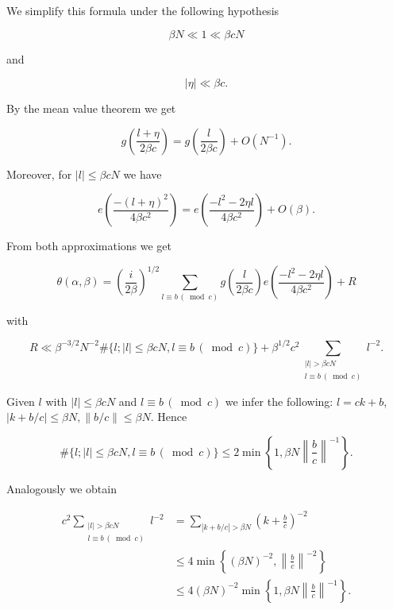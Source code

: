 \documentclass[10pt]{article}
\begin{document}
We simplify this formula under the following hypothesis


\begin{equation*}
\beta N \ll 1 \ll \beta c N \tag{9.4}
\end{equation*}


and


\begin{equation*}
|\eta| \ll \beta c . \tag{9.5}
\end{equation*}


By the mean value theorem we get

$$
g\left(\frac{l+\eta}{2\beta c}\right)=g\left(\frac{l}{2\beta c}\right)+O\left(N^{-1}\right) .
$$

Moreover, for $|l| \leqslant \beta c N$ we have

$$
e\left(\frac{-(l+\eta)^{2}}{4 \beta c^{2}}\right)=e\left(\frac{-l^{2}-2 \eta l}{4 \beta c^{2}}\right)+O(\beta) .
$$

From both approximations we get


\begin{equation*}
\theta(\alpha, \beta)=\left(\frac{i}{2 \beta}\right)^{1 / 2} \sum_{l \equiv b\, (\bmod c)} g\left(\frac{l}{2 \beta c}\right) e\left(\frac{-l^{2}-2 \eta l}{4 \beta c^{2}}\right)+R \tag{9.6}
\end{equation*}


with

$$
R \ll \beta^{-3 / 2} N^{-2} \#\{l ;|l| \leqslant \beta c N, l \equiv b\, (\bmod c)\}+\beta^{1 / 2} c^{2} \sum_{\substack{|l|>\beta c N \\ l \equiv b\, (\bmod c)}} l^{-2} .
$$

Given $l$ with $|l| \leqslant \beta c N$ and $l \equiv b\, (\bmod c)$ we infer the following: $l=c k+b$, $|k+b / c| \leqslant \beta N,\|b / c\| \leqslant \beta N$. Hence

$$
\#\{l ;|l| \leqslant \beta c N, l \equiv b\, (\bmod c)\} \leqslant 2 \min \left\{1, \beta N\left\|\frac{b}{c}\right\|^{-1}\right\} .
$$

Analogously we obtain

$$
\begin{aligned}
c^{2}\sum_{\substack{|l|>\beta cN\\ l\equiv b\, (\bmod c)}}l^{-2}
&=\sum_{|k+b/c|>\beta N}\left(k+\frac bc\right)^{-2}\\
&\leqslant 4\min\left\{(\beta N)^{-2},\left\|\frac bc\right\|^{-2}\right\}\\
&\leqslant 4(\beta N)^{-2}\min\left\{1,\beta N\left\|\frac bc\right\|^{-1}\right\}.
\end{aligned}
$$
\end{document}
